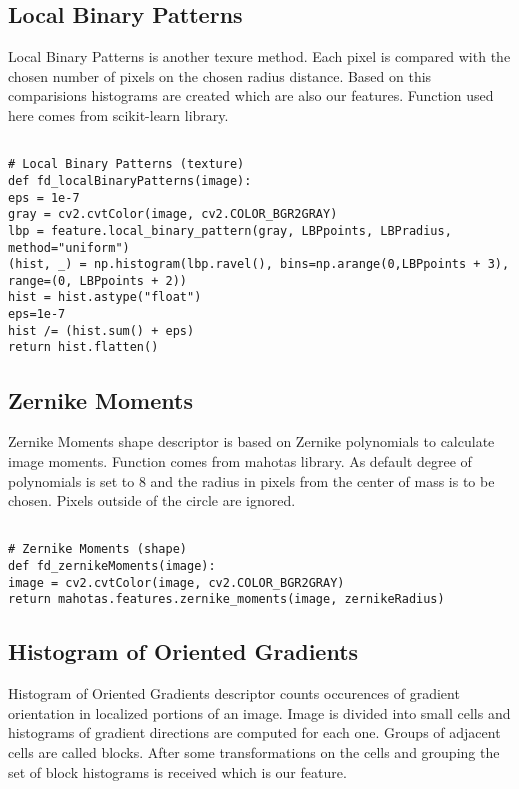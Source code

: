 \documentclass{article}
\begin{document}
\subsection{Local Binary Patterns}

Local Binary Patterns is another texure method. Each pixel is compared with the chosen number of pixels on the chosen radius distance. Based on this comparisions histograms are created which are also our features. Function used here comes from scikit-learn library.

\begin{verbatim}

# Local Binary Patterns (texture)
def fd_localBinaryPatterns(image):
eps = 1e-7
gray = cv2.cvtColor(image, cv2.COLOR_BGR2GRAY)
lbp = feature.local_binary_pattern(gray, LBPpoints, LBPradius, method="uniform")
(hist, _) = np.histogram(lbp.ravel(), bins=np.arange(0,LBPpoints + 3), range=(0, LBPpoints + 2))
hist = hist.astype("float")
eps=1e-7
hist /= (hist.sum() + eps)
return hist.flatten()

\end{verbatim}

\subsection{Zernike Moments}

Zernike Moments shape descriptor is based on Zernike polynomials to calculate image moments. Function comes from mahotas library. As default degree of polynomials is set to 8 and the radius in pixels from the center of mass is to be chosen. Pixels outside of the circle are ignored.

\begin{verbatim}

# Zernike Moments (shape)
def fd_zernikeMoments(image):
image = cv2.cvtColor(image, cv2.COLOR_BGR2GRAY)
return mahotas.features.zernike_moments(image, zernikeRadius)

\end{verbatim}

\subsection{Histogram of Oriented Gradients}

Histogram of Oriented Gradients descriptor counts occurences of gradient orientation in localized portions of an image. Image is divided into small cells and histograms of gradient directions are computed for each one. Groups of adjacent cells are called blocks. After some transformations on the cells and grouping the set of block histograms is received which is our feature.
\end{document}
